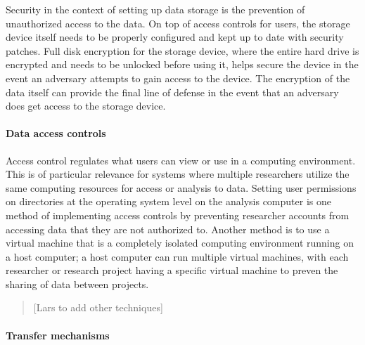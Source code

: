 Security in the context of setting up data storage is the prevention of
unauthorized access to the data. On top of access controls for users,
the storage device itself needs to be properly configured and kept up to
date with security patches. Full disk encryption for the storage device,
where the entire hard drive is encrypted and needs to be unlocked before
using it, helps secure the device in the event an adversary attempts to
gain access to the device. The encryption of the data itself can provide
the final line of defense in the event that an adversary does get access
to the storage device.

\hypertarget{data-access-controls}{%
\paragraph{Data access controls}\label{data-access-controls}}

Access control regulates what users can view or use in a computing
environment. This is of particular relevance for systems where multiple
researchers utilize the same computing resources for access or analysis
to data. Setting user permissions on directories at the operating system
level on the analysis computer is one method of implementing access
controls by preventing researcher accounts from accessing data that they
are not authorized to. Another method is to use a virtual machine that
is a completely isolated computing environment running on a host
computer; a host computer can run multiple virtual machines, with each
researcher or research project having a specific virtual machine to
preven the sharing of data between projects.

\begin{quote}
{[}Lars to add other techniques{]}
\end{quote}

\hypertarget{transfer-mechanisms}{%
\paragraph{Transfer mechanisms}\label{transfer-mechanisms}}

